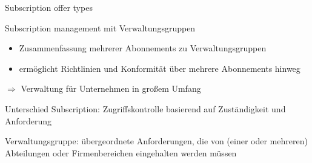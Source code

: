 \begin{flashcard}[Understand]{Subscription offer types}

\end{flashcard}

\begin{flashcard}[Understand]{Subscription management mit Verwaltungsgruppen}
    \begin{itemize}
        \item Zusammenfassung mehrerer Abonnements zu Verwaltungsgruppen
        \item ermöglicht Richtlinien und Konformität über mehrere Abonnements hinweg
    \end{itemize}
    $\Rightarrow$ Verwaltung für Unternehmen in großem Umfang

    \vspace{5mm}
    Unterschied Subscription: Zugriffskontrolle basierend auf Zuständigkeit und Anforderung
    
    Verwaltungsgruppe: übergeordnete Anforderungen, die von (einer oder mehreren) Abteilungen oder Firmenbereichen eingehalten werden müssen
\end{flashcard}
